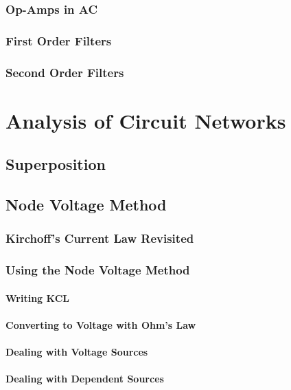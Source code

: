 \documentclass[a4paper,11pt]{book}
\begin{document}
\section{Op-Amps in AC}
\section{First Order Filters}
\section{Second Order Filters}

\part{Analysis of Circuit Networks}
\chapter{Superposition}

\chapter{Node Voltage Method}
\section{Kirchoff's Current Law Revisited}
\section{Using the Node Voltage Method}
\subsection*{Writing KCL}
\subsection*{Converting to Voltage with Ohm's Law}
\subsection*{Dealing with Voltage Sources}
\subsection*{Dealing with Dependent Sources}
\end{document}
